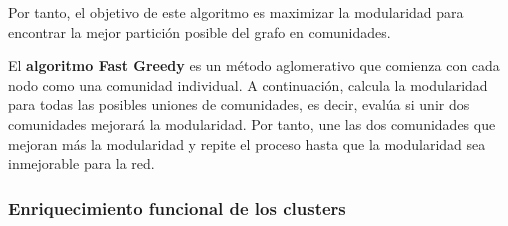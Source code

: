 Por tanto, el objetivo de este algoritmo es maximizar la modularidad para encontrar la mejor partición posible del grafo en comunidades.

El \textbf{algoritmo Fast Greedy} es un método aglomerativo que comienza con cada nodo como una comunidad individual. A continuación, calcula la modularidad para todas las posibles uniones de comunidades, es decir, evalúa si unir dos comunidades mejorará la modularidad. Por tanto, une las dos comunidades que mejoran más la modularidad y repite el proceso hasta que la modularidad sea inmejorable para la red.


\subsubsection{Enriquecimiento funcional de los clusters}